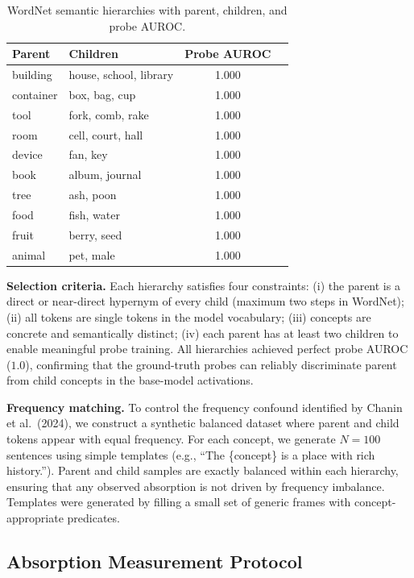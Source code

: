 \documentclass{article}
\begin{document}
\begin{table}[t]
\caption{WordNet semantic hierarchies with parent, children, and probe AUROC.}
\label{tab:hierarchies}
\centering
\begin{tabular}{llcc}
\toprule
Parent & Children & Probe AUROC \\
\midrule
building & house, school, library & 1.000 \\
container & box, bag, cup & 1.000 \\
tool & fork, comb, rake & 1.000 \\
room & cell, court, hall & 1.000 \\
device & fan, key & 1.000 \\
book & album, journal & 1.000 \\
tree & ash, poon & 1.000 \\
food & fish, water & 1.000 \\
fruit & berry, seed & 1.000 \\
animal & pet, male & 1.000 \\
\bottomrule
\end{tabular}
\end{table}

\textbf{Selection criteria.} Each hierarchy satisfies four constraints: (i) the parent is a direct or near-direct hypernym of every child (maximum two steps in WordNet); (ii) all tokens are single tokens in the model vocabulary; (iii) concepts are concrete and semantically distinct; (iv) each parent has at least two children to enable meaningful probe training. All hierarchies achieved perfect probe AUROC ($1.0$), confirming that the ground-truth probes can reliably discriminate parent from child concepts in the base-model activations.

\textbf{Frequency matching.} To control the frequency confound identified by Chanin et al.~(2024), we construct a synthetic balanced dataset where parent and child tokens appear with equal frequency. For each concept, we generate $N = 100$ sentences using simple templates (e.g., ``The \{concept\} is a place with rich history.''). Parent and child samples are exactly balanced within each hierarchy, ensuring that any observed absorption is not driven by frequency imbalance. Templates were generated by filling a small set of generic frames with concept-appropriate predicates.

\subsection{Absorption Measurement Protocol}
\label{sec:absorption-protocol}
\end{document}
